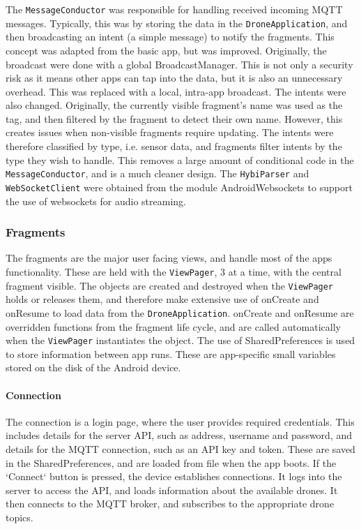 \documentclass{article}
\begin{document}
The \texttt{MessageConductor} was responsible for handling received incoming MQTT messages. Typically, this was by storing the data in the \texttt{DroneApplication}, and then broadcasting an intent (a simple message) to notify the fragments. This concept was adapted from the basic app, but was improved. Originally, the broadcast were done with a global BroadcastManager. This is not only a security risk as it means other apps can tap into the data, but it is also an unnecessary overhead. This was replaced with a local, intra-app broadcast. The intents were also changed. Originally, the currently visible fragment's name was used as the tag, and then filtered by the fragment to detect their own name. However, this creates issues when non-visible fragments require updating. The intents were therefore classified by type, i.e. sensor data, and fragments filter intents by the type they wish to handle. This removes a large amount of conditional code in the \texttt{MessageConductor}, and is a much cleaner design. The \texttt{HybiParser} and \texttt{WebSocketClient} were obtained from the module AndroidWebsockets\cite{androidWebsockets} to support the use of websockets for audio streaming.

\subsubsection{Fragments}
The fragments are the major user facing views, and handle most of the apps functionality. These are held with the \texttt{ViewPager}, 3 at a time, with the central fragment visible. The objects are created and destroyed when the \texttt{ViewPager} holds or releases them, and therefore make extensive use of onCreate and onResume to load data from the \texttt{DroneApplication}. onCreate and onResume are overridden functions from the fragment life cycle, and are called automatically when the \texttt{ViewPager} instantiates the object. The use of SharedPreferences is used to store information between app runs. These are app-specific small variables stored on the disk of the Android device.

\paragraph{Connection}
The connection is a login page, where the user provides required credentials. This includes details for the server API, such as address, username and password, and details for the MQTT connection, such as an API key and token. These are saved in the SharedPreferences, and are loaded from file when the app boots. If the `Connect` button is pressed, the device establishes connections. It logs into the server to access the API, and loads information about the available drones. It then connects to the MQTT broker, and subscribes to the appropriate drone topics.
\end{document}
